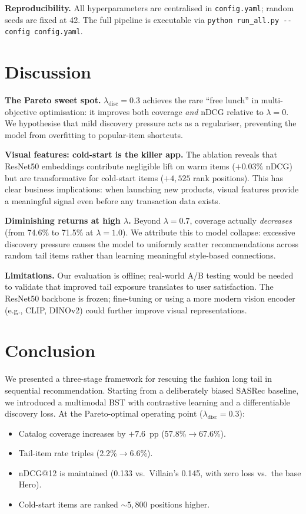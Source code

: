 \documentclass[11pt, a4paper]{article}
\let\oldsection\section
\renewcommand{\section}[1]{\FloatBarrier\oldsection{#1}}
\begin{document}
\textbf{Reproducibility.}\quad
All hyperparameters are centralised in \texttt{config.yaml}; random seeds are fixed at 42.
The full pipeline is executable via \texttt{python run\_all.py -{}-config config.yaml}.

\section{Discussion}
\label{sec:discussion}

\textbf{The Pareto sweet spot.}\quad
$\lambda_{\text{disc}}{=}0.3$ achieves the rare ``free lunch'' in multi-objective optimisation: it improves both coverage \emph{and} nDCG relative to $\lambda{=}0$.
We hypothesise that mild discovery pressure acts as a regulariser, preventing the model from overfitting to popular-item shortcuts.

\textbf{Visual features: cold-start is the killer app.}\quad
The ablation reveals that ResNet50 embeddings contribute negligible lift on warm items ($+0.03\%$ nDCG) but are transformative for cold-start items ($+4{,}525$ rank positions).
This has clear business implications: when launching new products, visual features provide a meaningful signal even before any transaction data exists.

\textbf{Diminishing returns at high $\lambda$.}\quad
Beyond $\lambda{=}0.7$, coverage actually \emph{decreases} (from 74.6\% to 71.5\% at $\lambda{=}1.0$).
We attribute this to model collapse: excessive discovery pressure causes the model to uniformly scatter recommendations across random tail items rather than learning meaningful style-based connections.

\textbf{Limitations.}\quad
Our evaluation is offline; real-world A/B testing would be needed to validate that improved tail exposure translates to user satisfaction.
The ResNet50 backbone is frozen; fine-tuning or using a more modern vision encoder (e.g., CLIP, DINOv2) could further improve visual representations.

\section{Conclusion}
\label{sec:conclusion}

We presented a three-stage framework for rescuing the fashion long tail in sequential recommendation.
Starting from a deliberately biased SASRec baseline, we introduced a multimodal BST with contrastive learning and a differentiable discovery loss.
At the Pareto-optimal operating point ($\lambda_{\text{disc}}{=}0.3$):
\begin{itemize}[leftmargin=*,itemsep=2pt]
    \item Catalog coverage increases by $+7.6$~pp (57.8\%$\to$67.6\%).
    \item Tail-item rate triples (2.2\%$\to$6.6\%).
    \item nDCG@12 is maintained (0.133 vs.\ Villain's 0.145, with zero loss vs.\ the base Hero).
    \item Cold-start items are ranked ${\sim}5{,}800$ positions higher.
\end{itemize}
\end{document}
